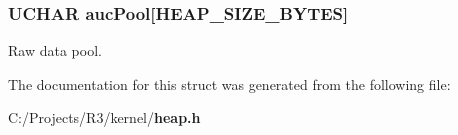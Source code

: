 \subsubsection[{aucPool}]{\setlength{\rightskip}{0pt plus 5cm}UCHAR {\bf aucPool}[HEAP\_\-SIZE\_\-BYTES]}\label{struct_h_e_a_p___s_t_r_u_c_t_a55c1522f1f568a8895aea1b54a9d9740}


Raw data pool. 

The documentation for this struct was generated from the following file:\begin{DoxyCompactItemize}
\item 
C:/Projects/R3/kernel/{\bf heap.h}\end{DoxyCompactItemize}
